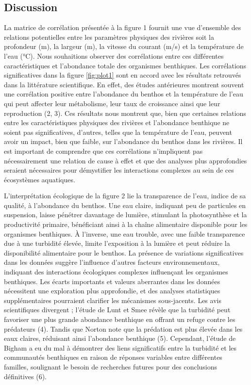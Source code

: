 \documentclass[9pt,twocolumn,twoside,]{pnas-new}
\begin{document}
\hypertarget{Discussion}{%
\subsection*{Discussion}\label{Discussion}}

La matrice de corrélation présentée à la figure 1 fournit une vue
d'ensemble des relations potentielles entre les paramètres physiques des
rivières soit la profondeur (m), la largeur (m), la vitesse du courant
(m/s) et la température de l'eau (°C). Nous souhaitions observer des
corrélations entre ces différentes caractéristiques et l'abondance
totale des organismes benthiques. Les corrélations significatives dans
la figure \ref{fig:plot1} sont en accord avec les résultats retrouvés
dans la littérature scientifique. En effet, des études antérieures
montrent souvent une corrélation positive entre l'abondance du benthos
et la température de l'eau qui peut affecter leur métabolisme, leur taux
de croissance ainsi que leur reproduction (2, 3). Ces résultats nous
montrent que, bien que certaines relations entre les caractéristiques
physiques des rivières et l'abondance benthique ne soient pas
significatives, d'autres, telles que la température de l'eau, peuvent
avoir un impact, bien que faible, sur l'abondance du benthos dans les
rivières. Il est important de comprendre que ces corrélations
n'impliquent pas nécessairement une relation de cause à effet et que des
analyses plus approfondies seraient nécessaires pour démystifier les
interactions complexes au sein de ces écosystèmes aquatiques.

L'interprétation écologique de la figure 2 lie la transparence de l'eau,
indice de sa qualité, à l'abondance du benthos. Une eau claire,
indiquant peu de particules en suspension, laisse pénétrer davantage de
lumière, stimulant la photosynthèse et la productivité primaire,
bénéficiant ainsi à la chaîne alimentaire disponible pour les organismes
benthiques. À l'inverse, une eau trouble, avec une faible transparence
due à une turbidité élevée, limite l'exposition à la lumière et peut
réduire la disponibilité alimentaire pour le benthos. La présence de
variations significatives dans les données suggère l'influence d'autres
facteurs environnementaux, indiquant des interactions écologiques
complexes influençant les organismes benthiques. Les écarts importants
et valeurs aberrantes dans les données nécessitent une exploration plus
approfondie, et des analyses statistiques supplémentaires pourraient
clarifier les mécanismes sous-jacents. Les avis scientifiques divergent
; l'étude de Lunt et Smee révèle que la turbidité peut favoriser une
plus grande abondance benthique en offrant un refuge contre les
prédateurs (4). Tandis que Norton note que la prédation est plus élevée
dans les eaux claires, réduisant ainsi l'abondance benthique (5).
Cependant, l'étude de Bigham a eu du mal à démontrer des liens
significatifs entre la turbidité et les communautés benthiques en raison
de réponses variables entre différentes familles, soulignant le besoin
de recherches futures pour des conclusions définitives (6).
\end{document}
